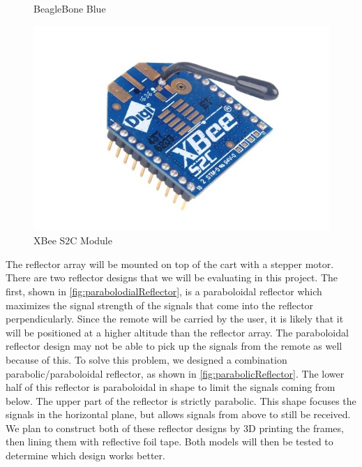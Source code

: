 \begin{figure}
\begin{minipage}[t]{0.32\textwidth}
    \captionsetup{width=\textwidth}
    \caption{BeagleBone Blue}
    \label{fig:beagleboneBlue}
  \end{minipage}
  \begin{minipage}[t]{0.32\textwidth}
    \includegraphics[width=1\textwidth]{figs/img/Xbee-S2C-Module}
    \captionsetup{width=\textwidth}
    \caption{XBee S2C Module}
    \label{fig:XBeeModule}
  \end{minipage}
\end{figure}

\vspace*{12pt}
\noindent
The reflector array will be mounted on top of the cart with a stepper motor. There are two reflector designs that we will be evaluating in this project. The first, shown in \autoref{fig:parabolodialReflector}, is a paraboloidal reflector which maximizes the signal strength of the signals that come into the reflector perpendicularly. Since the remote will be carried by the user, it is likely that it will be positioned at a higher altitude than the reflector array. The paraboloidal reflector design may not be able to pick up the signals from the remote as well because of this. To solve this problem, we designed a combination parabolic/paraboloidal reflector, as shown in \autoref{fig:parabolicReflector}. The lower half of this reflector is paraboloidal in shape to limit the signals coming from below. The upper part of the reflector is strictly parabolic. This shape focuses the signals in the horizontal plane, but allows signals from above to still be received. We plan to construct both of these reflector designs by 3D printing the frames, then lining them with reflective foil tape. Both models will then be tested to determine which design works better.


